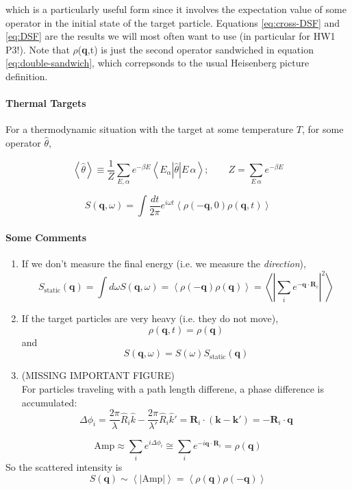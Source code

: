 \documentclass{article}
\begin{document}
			which is a particularly useful form since it involves the expectation value of some operator in the initial state of the target particle. Equations \ref{eq:cross-DSF} and \ref{eq:DSF} are the results we will most often want to use (in particular for HW1 P3!). Note that $\rho$(\textbf{q},t) is just the second operator sandwiched in equation \ref{eq:double-sandwich}, which correpsonds to the usual Heisenberg picture definition. 
			
			\paragraph{Thermal Targets} For a thermodynamic situation with the target at some temperature $T$, for some operator $\hat{\theta}$,
			
			$$\left<\hat{\theta}\right>\equiv \frac{1}{Z}\sum_{E,\alpha}e^{-\beta E}\left<E_\alpha\left|\hat{\theta}\right|E\,\alpha\right>;\qquad Z=\sum_{E\,\alpha}e^{-\beta E}$$
			\begin{center}
				$$\displaystyle S(\mathbf{q},\omega)=\int\frac{dt}{2\pi}e^{i\omega t}\left<\rho(-\mathbf{q},0)\rho(\mathbf{q},t)\right>$$
			\end{center}
			\paragraph{Some Comments}
			\begin{enumerate}
				\item If we don't measure the final energy (i.e. we measure the \emph{direction}),
				$$S_{\mathrm{static}}(\mathbf{q})=\int d\omega S(\mathbf{q},\omega)=\left<\rho(-\mathbf{q})\rho(\mathbf{q})\right>=\left<\left|\sum_ie^{-\mathbf{q}\cdot\mathbf{R}_i}\right|^2\right>$$
				\item If the target particles are very heavy (i.e. they do not move),
				$$\rho(\mathbf{q},t)=\rho(\mathbf{q})$$
				and
				$$S(\mathbf{q},\omega)=S(\omega)S_{\mathrm{static}}(\mathbf{q})$$
				\item (MISSING IMPORTANT FIGURE)\\
				
				\noindent For particles traveling with a path length differene, a phase difference is accumulated:
				$$\Delta \phi_i=\frac{2\pi}{\lambda}\hat{R}_i\hat{k}-\frac{2\pi}{\lambda'}\hat{R}_i\hat{k}'=\mathbf{R}_i\cdot(\mathbf{k}-\mathbf{k}')=-\mathbf{R}_i\cdot\mathbf{q}$$
			\end{enumerate}
			$$\mathrm{Amp}\approx \sum_i e^{i\Delta\phi_i}\cong \sum_ie^{-i\mathbf{q}\cdot\mathbf{R}_i}=\rho(\mathbf{q})$$
			So the scattered intensity is
			$$S(\mathbf{q})\sim\left<\left|\mathrm{Amp}\right|\right>=\left<\rho(\mathbf{q})\rho(-\mathbf{q})\right>$$
\end{document}
